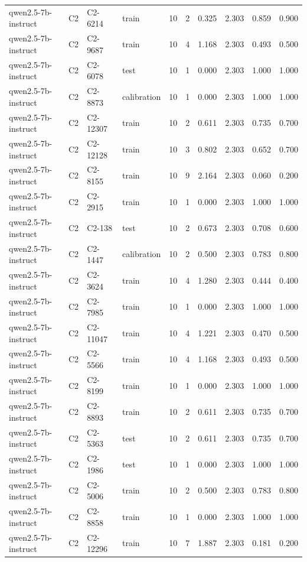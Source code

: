\begin{table}
\begin{tabular}{llllrrrrrr}
qwen2.5-7b-instruct & C2 & C2-6214 & train & 10 & 2 & 0.325 & 2.303 & 0.859 & 0.900 \\
qwen2.5-7b-instruct & C2 & C2-9687 & train & 10 & 4 & 1.168 & 2.303 & 0.493 & 0.500 \\
qwen2.5-7b-instruct & C2 & C2-6078 & test & 10 & 1 & 0.000 & 2.303 & 1.000 & 1.000 \\
qwen2.5-7b-instruct & C2 & C2-8873 & calibration & 10 & 1 & 0.000 & 2.303 & 1.000 & 1.000 \\
qwen2.5-7b-instruct & C2 & C2-12307 & train & 10 & 2 & 0.611 & 2.303 & 0.735 & 0.700 \\
qwen2.5-7b-instruct & C2 & C2-12128 & train & 10 & 3 & 0.802 & 2.303 & 0.652 & 0.700 \\
qwen2.5-7b-instruct & C2 & C2-8155 & train & 10 & 9 & 2.164 & 2.303 & 0.060 & 0.200 \\
qwen2.5-7b-instruct & C2 & C2-2915 & train & 10 & 1 & 0.000 & 2.303 & 1.000 & 1.000 \\
qwen2.5-7b-instruct & C2 & C2-138 & test & 10 & 2 & 0.673 & 2.303 & 0.708 & 0.600 \\
qwen2.5-7b-instruct & C2 & C2-1447 & calibration & 10 & 2 & 0.500 & 2.303 & 0.783 & 0.800 \\
qwen2.5-7b-instruct & C2 & C2-3624 & train & 10 & 4 & 1.280 & 2.303 & 0.444 & 0.400 \\
qwen2.5-7b-instruct & C2 & C2-7985 & train & 10 & 1 & 0.000 & 2.303 & 1.000 & 1.000 \\
qwen2.5-7b-instruct & C2 & C2-11047 & train & 10 & 4 & 1.221 & 2.303 & 0.470 & 0.500 \\
qwen2.5-7b-instruct & C2 & C2-5566 & train & 10 & 4 & 1.168 & 2.303 & 0.493 & 0.500 \\
qwen2.5-7b-instruct & C2 & C2-8199 & train & 10 & 1 & 0.000 & 2.303 & 1.000 & 1.000 \\
qwen2.5-7b-instruct & C2 & C2-8893 & train & 10 & 2 & 0.611 & 2.303 & 0.735 & 0.700 \\
qwen2.5-7b-instruct & C2 & C2-5363 & test & 10 & 2 & 0.611 & 2.303 & 0.735 & 0.700 \\
qwen2.5-7b-instruct & C2 & C2-1986 & test & 10 & 1 & 0.000 & 2.303 & 1.000 & 1.000 \\
qwen2.5-7b-instruct & C2 & C2-5006 & train & 10 & 2 & 0.500 & 2.303 & 0.783 & 0.800 \\
qwen2.5-7b-instruct & C2 & C2-8858 & train & 10 & 1 & 0.000 & 2.303 & 1.000 & 1.000 \\
qwen2.5-7b-instruct & C2 & C2-12296 & train & 10 & 7 & 1.887 & 2.303 & 0.181 & 0.200 \\

\end{tabular}
\end{table}
